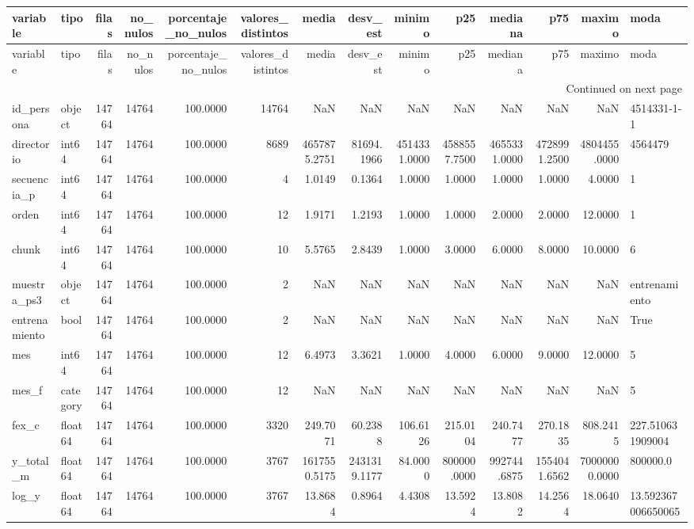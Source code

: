 \begin{longtable}{llrrrrrrrrrrrl}
\toprule
variable & tipo & filas & no\_nulos & porcentaje\_no\_nulos & valores\_distintos & media & desv\_est & minimo & p25 & mediana & p75 & maximo & moda \\
\midrule
\endfirsthead
\toprule
variable & tipo & filas & no\_nulos & porcentaje\_no\_nulos & valores\_distintos & media & desv\_est & minimo & p25 & mediana & p75 & maximo & moda \\
\midrule
\endhead
\midrule
\multicolumn{14}{r}{Continued on next page} \\
\midrule
\endfoot
\bottomrule
\endlastfoot
id\_persona & object & 14764 & 14764 & 100.0000 & 14764 & NaN & NaN & NaN & NaN & NaN & NaN & NaN & 4514331-1-1 \\
directorio & int64 & 14764 & 14764 & 100.0000 & 8689 & 4657875.2751 & 81694.1966 & 4514331.0000 & 4588557.7500 & 4655331.0000 & 4728991.2500 & 4804455.0000 & 4564479 \\
secuencia\_p & int64 & 14764 & 14764 & 100.0000 & 4 & 1.0149 & 0.1364 & 1.0000 & 1.0000 & 1.0000 & 1.0000 & 4.0000 & 1 \\
orden & int64 & 14764 & 14764 & 100.0000 & 12 & 1.9171 & 1.2193 & 1.0000 & 1.0000 & 2.0000 & 2.0000 & 12.0000 & 1 \\
chunk & int64 & 14764 & 14764 & 100.0000 & 10 & 5.5765 & 2.8439 & 1.0000 & 3.0000 & 6.0000 & 8.0000 & 10.0000 & 6 \\
muestra\_ps3 & object & 14764 & 14764 & 100.0000 & 2 & NaN & NaN & NaN & NaN & NaN & NaN & NaN & entrenamiento \\
entrenamiento & bool & 14764 & 14764 & 100.0000 & 2 & NaN & NaN & NaN & NaN & NaN & NaN & NaN & True \\
mes & int64 & 14764 & 14764 & 100.0000 & 12 & 6.4973 & 3.3621 & 1.0000 & 4.0000 & 6.0000 & 9.0000 & 12.0000 & 5 \\
mes\_f & category & 14764 & 14764 & 100.0000 & 12 & NaN & NaN & NaN & NaN & NaN & NaN & NaN & 5 \\
fex\_c & float64 & 14764 & 14764 & 100.0000 & 3320 & 249.7071 & 60.2388 & 106.6126 & 215.0104 & 240.7477 & 270.1835 & 808.2415 & 227.510631909004 \\
y\_total\_m & float64 & 14764 & 14764 & 100.0000 & 3767 & 1617550.5175 & 2431319.1177 & 84.0000 & 800000.0000 & 992744.6875 & 1554041.6562 & 70000000.0000 & 800000.0 \\
log\_y & float64 & 14764 & 14764 & 100.0000 & 3767 & 13.8684 & 0.8964 & 4.4308 & 13.5924 & 13.8082 & 14.2564 & 18.0640 & 13.592367006650065 \\

\end{longtable}
